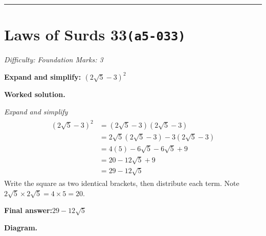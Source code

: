 \documentclass[11pt]{article}
\newcommand{\question}[1]{\par\medskip\noindent\textbf{#1}\par}
\begin{document}
\medskip\hrule

\section*{Laws of Surds 33\quad\small\texttt{(a5-033)}}
\textit{Difficulty: Foundation \quad\textbar\quad Marks: 3}

\question{Expand and simplify: \( (2\sqrt{5} - 3)^2 \)}

\textbf{Worked solution.}

\textit{Expand and simplify}
\[\begin{gathered}
\begin{aligned} (2\sqrt{5}-3)^2 &= (2\sqrt{5}-3)(2\sqrt{5}-3) \\ &= 2\sqrt{5}(2\sqrt{5}-3)-3(2\sqrt{5}-3) \\ &= 4(5)-6\sqrt{5}-6\sqrt{5}+9 \\ &= 20-12\sqrt{5}+9 \\ &= 29 - 12\sqrt{5} \end{aligned}
\end{gathered}\]
Write the square as two identical brackets, then distribute each term. Note \(2\sqrt{5} \times 2\sqrt{5} = 4 \times 5 = 20\).

\begin{answerbox}
\textbf{Final answer:}\quad \(\displaystyle 29 - 12\sqrt{5}\)
\end{answerbox}
\textbf{Diagram.}
\end{document}
